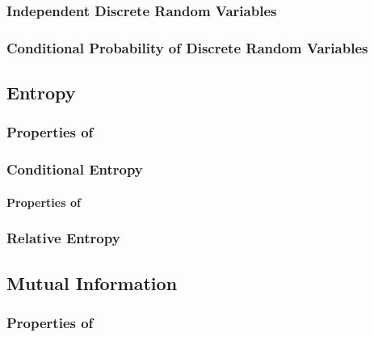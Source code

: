 \subsubsection{Independent Discrete Random Variables}\label{subsubsec:Independent_Discrete_Random_Variables}
\subsubsection{Conditional Probability of  Discrete Random Variables}\label{subsubsec:Conditional_Probability_Discrete_Random_Variables}

\subsection{Entropy}\label{subsec:Entropy}
\subsubsection{Properties of }\label{subsubsec:Entropy_Properties}

\subsubsection{Conditional Entropy}\label{subsubsec:Conditional_Entropy}
\paragraph{Properties of }\label{par:Conditional_Entropy_Properties}

\subsubsection{Relative Entropy}\label{subsubsec:Relative_Entropy}

\subsection{Mutual Information}\label{subsec:Mutual_Information}
\subsubsection{Properties of }\label{subsubsec:Mutual_Information_Properties}
